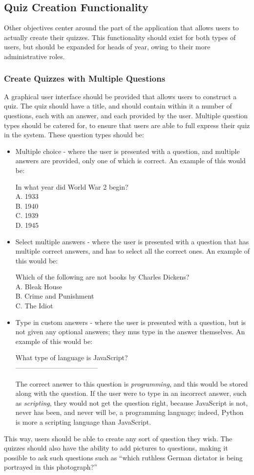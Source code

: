 \subsection{Quiz Creation Functionality}
Other objectives center around the part of the application that allows users to actually create their quizzes. This functionality should exist for both types of users, but should be expanded for heads of year, owing to their more administrative roles.

\subsubsection{Create Quizzes with Multiple Questions} 
A graphical user interface should be provided that allows users to construct a quiz. The quiz should have a title, and should contain within it a number of questions, each with an answer, and each provided by the user. Multiple question types should be catered for, to ensure that users are able to full express their quiz in the system. These question types should be:\\

\begin{itemize}
\item Multiple choice - where the user is presented with a question, and multiple answers are provided, only one of which is correct. An example of this would be:

In what year did World War 2 begin?\\
A. 1933\\
B. 1940\\
C. 1939\\
D. 1945

\item Select multiple answers - where the user is presented with a question that has multiple correct answers, and has to select all the correct ones. An example of this would be:

Which of the following are not books by Charles Dickens?\\
A. Bleak House\\
B. Crime and Punishment\\
C. The Idiot

\item Type in custom answers - where the user is presented with a question, but is not given any optional answers; they mus type in the answer themselves. An example of this would be:

What type of language is JavaScript?\\

------------------------------------

The correct answer to this question is \textit{programming}, and this would be stored along with the question. If the user were to type in an incorrect answer, such as \textit{scripting}, they would not get the question right, because JavaScript is not, never has been, and never will be, a programming language; indeed, Python is more a scripting language than JavaScript.\\
\end{itemize}

This way, users should be able to create any sort of question they wish. The quizzes should also have the ability to add pictures to questions, making it possible to ask such questions such as ``which ruthless German dictator is being portrayed in this photograph?''
